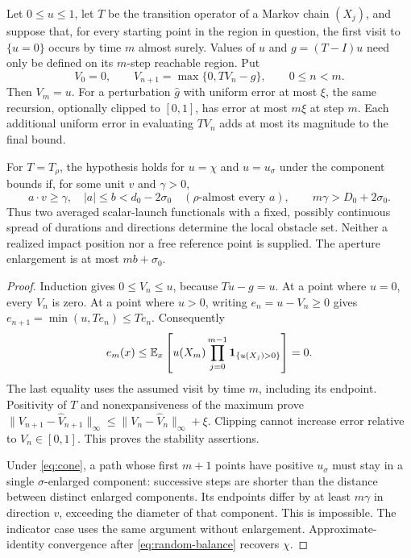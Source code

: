 \begin{theorem}\label{thm:stopped}
Let $0\le u\le1$, let $T$ be the transition operator of a Markov chain
$(X_j)$, and suppose that, for every starting point in the region in
question, the first visit to $\{u=0\}$ occurs by time $m$ almost surely.
Values of $u$ and $g=(T-I)u$ need only be defined on its $m$-step
reachable region. Put
\begin{equation}\label{eq:bellman}
 V_0=0,\qquad V_{n+1}=\max\{0,TV_n-g\},\qquad 0\le n<m.
\end{equation}
Then $V_m=u$. For a perturbation $\widehat g$ with uniform error
at most $\xi$, the same recursion, optionally clipped to $[0,1]$,
has error at most $m\xi$ at step $m$. Each additional uniform error
in evaluating $TV_n$ adds at most its magnitude to the final bound.

For $T=T_\rho$, the hypothesis holds for $u=\chi$ and $u=u_\sigma$
under the component bounds if, for some unit $v$ and $\gamma>0$,
\begin{equation}\label{eq:cone}
 a\cdot v\ge\gamma,
 \quad |a|\le b<d_0-2\sigma_0
 \quad(\rho\text{-almost every }a),
 \qquad m\gamma>D_0+2\sigma_0.
\end{equation}
Thus two averaged scalar-launch functionals with a fixed, possibly
continuous spread of durations and directions determine the local
obstacle set. Neither a realized impact position nor a free reference
point is supplied. The aperture enlargement is at most $mb+\sigma_0$.
\end{theorem}
\begin{proof}
Induction gives $0\le V_n\le u$, because $Tu-g=u$. At a point where
$u=0$, every $V_n$ is zero. At a point where $u>0$, writing
$e_n=u-V_n\ge0$ gives
$e_{n+1}=\min(u,Te_n)\le Te_n$. Consequently
\[
 e_m(x)\le\mathbb E_x\left[u(X_m)
                 \prod_{j=0}^{m-1}\mathbf 1_{\{u(X_j)>0\}}\right]=0.
\]
The last equality uses the assumed visit by time $m$, including its
endpoint. Positivity of $T$ and nonexpansiveness of the maximum prove
$\|V_{n+1}-\widehat V_{n+1}\|_\infty
 \le\|V_n-\widehat V_n\|_\infty+\xi$.
Clipping cannot increase error relative to $V_n\in[0,1]$. This proves
the stability assertions.

Under \eqref{eq:cone}, a path whose first $m+1$ points have positive
$u_\sigma$ must stay in a single $\sigma$-enlarged component: successive
steps are shorter than the distance between distinct enlarged components.
Its endpoints differ by at least $m\gamma$ in direction $v$, exceeding
the diameter of that component. This is impossible. The indicator case
uses the same argument without enlargement. Approximate-identity
convergence after \eqref{eq:random-balance} recovers $\chi$.
\end{proof}

